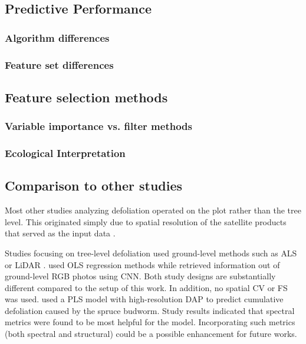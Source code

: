 \documentclass[letterpaper, journal]{IEEEtran}
\begin{document}
\subsection{Predictive Performance}

\subsubsection{Algorithm differences}

\subsubsection{Feature set differences}

\subsection{Feature selection methods}

\subsubsection{Variable importance vs. filter methods}

\subsubsection{Ecological Interpretation}


\subsection{Comparison to other studies}

\noindent Most other studies analyzing defoliation operated on the plot rather than the tree level.
This originated simply due to spatial resolution of the satellite products that served as the input data \cite{townsend2012, debeurs2008a, rengarajan2016}.

Studies focusing on tree-level defoliation used ground-level methods such as \ac{ALS} or \ac{LiDAR} \cite{meng2018, kalin2019}.
\cite{meng2018} used \ac{OLS} regression methods while \cite{kalin2019} retrieved information out of ground-level RGB photos using \ac{CNN}.
Both study designs are substantially different compared to the setup of this work.
In addition, no spatial \ac{CV} or \ac{FS} was used.
\cite{goodbody2018} used a \ac{PLS} model with high-resolution \ac{DAP} to predict cumulative defoliation caused by the spruce budworm.
Study results indicated that spectral metrics were found to be most helpful for the model.
Incorporating such metrics (both spectral and structural) could be a possible enhancement for future works.
\end{document}

